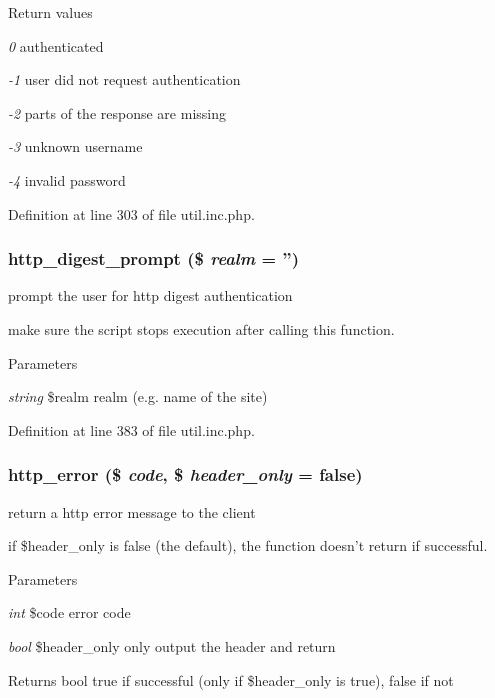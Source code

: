 \begin{DoxyRetVals}{Return values}
\item[{\em 0}]authenticated \item[{\em -\/1}]user did not request authentication \item[{\em -\/2}]parts of the response are missing \item[{\em -\/3}]unknown username \item[{\em -\/4}]invalid password \end{DoxyRetVals}


Definition at line 303 of file util.inc.php.

\hypertarget{util_8inc_8php_a95d221746e2d296434b0d63f78cedf57}{
\subsubsection[{http\_\-digest\_\-prompt}]{\setlength{\rightskip}{0pt plus 5cm}http\_\-digest\_\-prompt (\$ {\em realm} = {\ttfamily ''})}}
\label{util_8inc_8php_a95d221746e2d296434b0d63f78cedf57}
prompt the user for http digest authentication

make sure the script stops execution after calling this function. 
\begin{DoxyParams}{Parameters}
\item[{\em string}]\$realm realm (e.g. name of the site) \end{DoxyParams}


Definition at line 383 of file util.inc.php.

\hypertarget{util_8inc_8php_ae51039516309f10d5be73220f351e808}{
\subsubsection[{http\_\-error}]{\setlength{\rightskip}{0pt plus 5cm}http\_\-error (\$ {\em code}, \/  \$ {\em header\_\-only} = {\ttfamily false})}}
\label{util_8inc_8php_ae51039516309f10d5be73220f351e808}
return a http error message to the client

if \$header\_\-only is false (the default), the function doesn't return if successful. 
\begin{DoxyParams}{Parameters}
\item[{\em int}]\$code error code \item[{\em bool}]\$header\_\-only only output the header and return \end{DoxyParams}
\begin{DoxyReturn}{Returns}
bool true if successful (only if \$header\_\-only is true), false if not 
\end{DoxyReturn}


